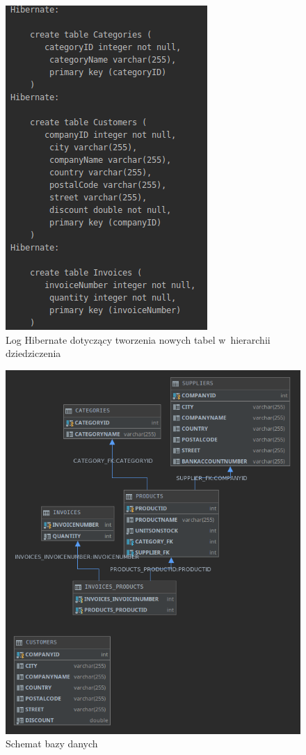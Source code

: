 \documentclass[12pt, a4paper]{mwart}
\begin{document}
\begin{figure}[ht]
  \centering
  \includegraphics[scale=0.5]{XI/11-9.png}
  \caption{Log Hibernate dotyczący tworzenia nowych tabel w~hierarchii dziedziczenia}
  \label{rys:11.9}
\end{figure}

\begin{figure}[ht]
  \centering
  \includegraphics[scale=0.45]{XI/11-10.png}
  \caption{Schemat bazy danych}
  \label{rys:11.10}
\end{figure}
\end{document}
